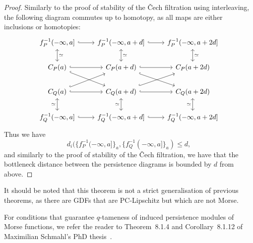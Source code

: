 \begin{proof}
    Similarly to the proof of stability of the \v{C}ech filtration using
    interleaving, the following diagram commutes up to homotopy, as all maps are
    either inclusions or homotopies:
    \begin{equation}
        \begin{tikzcd}
            f^{-1}_P(-\infty, a] \arrow[hook]{r} \arrow[leftrightarrow]{d}{\simeq}
            & f^{-1}_P(-\infty, a + d] \arrow[hook]{r} \arrow[leftrightarrow]{d}{\simeq}
            & f^{-1}_P(-\infty, a + 2d] \arrow[leftrightarrow]{d}{\simeq} \\
            C_P(a) \arrow[hook]{r} \arrow[hook]{dr}
            & C_P(a + d) \arrow[hook]{r} \arrow[hook]{dr}
            & C_P(a + 2d) \\
            C_Q(a) \arrow[hook]{r} \arrow[hook]{ur}
            & C_Q(a + d) \arrow[hook]{r} \arrow[hook]{ur}
            & C_Q(a + 2d) \\
            f^{-1}_Q(-\infty, a] \arrow[hook]{r} \arrow[leftrightarrow]{u}{\simeq}
            & f^{-1}_Q(-\infty, a + d] \arrow[hook]{r} \arrow[leftrightarrow]{u}{\simeq}
            & f^{-1}_Q(-\infty, a + 2d] \arrow[leftrightarrow]{u}{\simeq}
        \end{tikzcd}
    \end{equation}
    Thus we have
    \begin{equation}
        d_i(\{f^{-1}_P(-\infty, a]\}_a, \{f^{-1}_Q(-\infty, a]\}_a) \leq d,
    \end{equation}
    and similarly to the proof of stability of the \v{C}ech filtration, we have
    that the bottleneck distance between the persistence diagrams is bounded by
    $d$ from above.
\end{proof}
It should be noted that this theorem is not a strict generalisation of previous
theorems, as there are GDFs that are PC-Lipschitz but which are not Morse.

For conditions that guarantee $q$-tameness of induced persistence modules
of Morse functions, we refer the reader to Theorem~8.1.4 and Corollary~8.1.12 of
Maximilian Schmahl's PhD thesis~\cite{schmahl2023topics}.